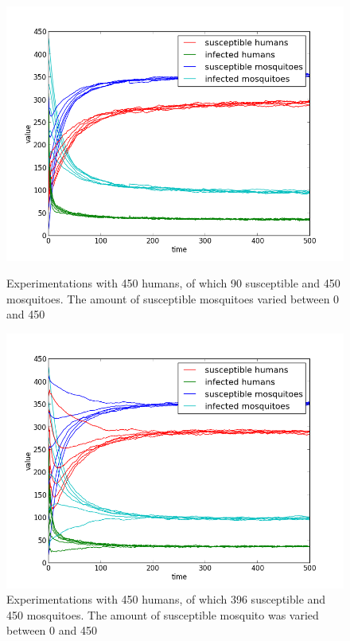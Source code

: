 \documentclass[a4paper]{report}
\begin{document}
\begin{figure}[ht]
    \begin{minipage}[b]{0.8\linewidth} 
        \centering
        \includegraphics[scale=0.5]{var_mosquito_suscept_05_02_05.png}
        \caption{Experimentations with 450 humans, of which 90 susceptible and 450
        mosquitoes. The amount of susceptible mosquitoes varied between 0 and
    450 }
        \label{fig:figure1}
    \end{minipage}
    \begin{minipage}[b]{0.8\linewidth}
        \centering
        \includegraphics[scale=0.5]{var_mosquito_suscept_05_08_05.png}
        \caption{Experimentations with 450 humans, of which 396 susceptible and 450
        mosquitoes. The amount of susceptible mosquito was varied between 0 and
        450}
        \label{fig:figure2}
    \end{minipage}
\end{figure}
\end{document}
